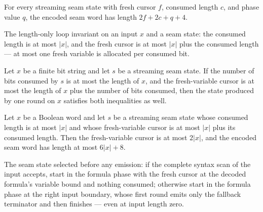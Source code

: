 \begin{lemma}
\label{Complexity.satStreamWord_length}
\leanok
{}
For every streaming seam state with fresh cursor $f$, consumed length $c$, and phase
value $q$, the encoded seam word has length $2f+2c+q+4$.
\end{lemma}

\begin{definition}
\label{Complexity.satStreamBound}
\leanok
{}
The length-only loop invariant on an input $x$ and a seam state: the consumed
length is at most $|x|$, and the fresh cursor is at most $|x|$ plus the consumed
length — at most one fresh variable is allocated per consumed bit.
\end{definition}

\begin{lemma}
\label{Complexity.satStreamRound_bound}
\leanok
{}
Let $x$ be a finite bit string and let $s$ be a streaming seam state. If the number of
bits consumed by $s$ is at most the length of $x$, and the fresh-variable cursor is at
most the length of $x$ plus the number of bits consumed, then the state produced by one
round on $x$ satisfies both inequalities as well.
\end{lemma}

\begin{lemma}
\label{Complexity.satStreamBound_size}
\leanok
{}
Let $x$ be a Boolean word and let $s$ be a streaming seam state whose consumed length is
at most $|x|$ and whose fresh-variable cursor is at most $|x|$ plus its consumed length.
Then the fresh-variable cursor is at most $2|x|$, and the encoded seam word has length
at most $6|x|+8$.
\end{lemma}

\begin{definition}
\label{Complexity.satStreamStart}
\leanok
{}
The seam state selected before any emission: if the complete syntax scan of the
input accepts, start in the formula phase with the fresh cursor at the decoded
formula's variable bound and nothing consumed; otherwise start in the formula
phase at the right input boundary, whose first round emits only the fallback
terminator and then finishes — even at input length zero.
\end{definition}

